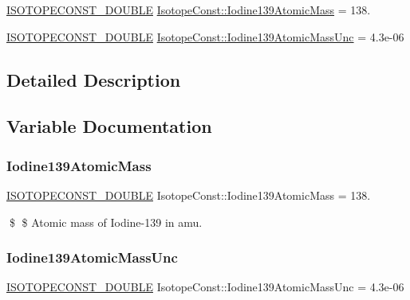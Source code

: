 \begin{DoxyCompactItemize}
\item 
\mbox{\hyperlink{group___isotope_const-_macros_ga8f45a7272ce02c0b4c65c44636ed719a}{I\+S\+O\+T\+O\+P\+E\+C\+O\+N\+S\+T\+\_\+\+D\+O\+U\+B\+LE}} \mbox{\hyperlink{group___isotope_const-_iodine-_i139_ga447a221722db9b6caf618261025ef5ac}{Isotope\+Const\+::\+Iodine139\+Atomic\+Mass}} = 138.
\item 
\mbox{\hyperlink{group___isotope_const-_macros_ga8f45a7272ce02c0b4c65c44636ed719a}{I\+S\+O\+T\+O\+P\+E\+C\+O\+N\+S\+T\+\_\+\+D\+O\+U\+B\+LE}} \mbox{\hyperlink{group___isotope_const-_iodine-_i139_ga0a688d770eb873beecc817387ce7d514}{Isotope\+Const\+::\+Iodine139\+Atomic\+Mass\+Unc}} = 4.\+3e-\/06
\end{DoxyCompactItemize}


\subsection{Detailed Description}


\subsection{Variable Documentation}
\mbox{\label{group___isotope_const-_iodine-_i139_ga447a221722db9b6caf618261025ef5ac}} 
\subsubsection{\texorpdfstring{Iodine139\+Atomic\+Mass}{Iodine139AtomicMass}}
{\footnotesize\ttfamily \mbox{\hyperlink{group___isotope_const-_macros_ga8f45a7272ce02c0b4c65c44636ed719a}{I\+S\+O\+T\+O\+P\+E\+C\+O\+N\+S\+T\+\_\+\+D\+O\+U\+B\+LE}} Isotope\+Const\+::\+Iodine139\+Atomic\+Mass = 138.}

\$ \$ Atomic mass of Iodine-\/139 in amu. \mbox{\label{group___isotope_const-_iodine-_i139_ga0a688d770eb873beecc817387ce7d514}} 
\subsubsection{\texorpdfstring{Iodine139\+Atomic\+Mass\+Unc}{Iodine139AtomicMassUnc}}
{\footnotesize\ttfamily \mbox{\hyperlink{group___isotope_const-_macros_ga8f45a7272ce02c0b4c65c44636ed719a}{I\+S\+O\+T\+O\+P\+E\+C\+O\+N\+S\+T\+\_\+\+D\+O\+U\+B\+LE}} Isotope\+Const\+::\+Iodine139\+Atomic\+Mass\+Unc = 4.\+3e-\/06}

